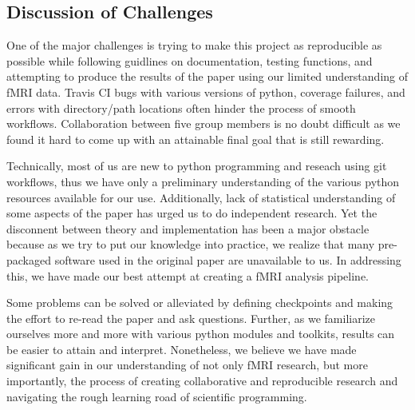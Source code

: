 \subsection{Discussion of Challenges}

\par \indent One of the major challenges is trying to make this project as 
reproducible as possible while following guidlines on documentation, testing 
functions, and attempting to produce the results of the paper using our limited
understanding of fMRI data. Travis CI bugs with various versions of python, 
coverage failures, and errors with directory/path locations often hinder the 
process of smooth workflows. Collaboration between five group members is no 
doubt difficult as we found it hard to come up with an attainable final goal 
that is still rewarding. 
\par Technically, most of us are new to python programming and reseach using 
git workflows, thus we have only a preliminary understanding of the various 
python resources available for our use. Additionally, lack of statistical 
understanding of some aspects of the paper has urged us to do independent 
research. Yet the disconnent between theory and implementation has been a major 
obstacle because as we try to put our knowledge into practice, we realize that
many pre-packaged software used in the original paper are unavailable to us. 
In addressing this, we have made our best attempt at creating a fMRI analysis 
pipeline. 
\par Some problems can be solved or alleviated by defining checkpoints and making
the effort to re-read the paper and ask questions. Further, as we familiarize 
ourselves more and more  with various python modules and toolkits, results can 
be easier to attain and interpret. Nonetheless, we believe we have made 
significant gain in our understanding of not only fMRI research, but more 
importantly, the process of creating collaborative and reproducible research and
navigating the rough learning road of scientific programming. 
